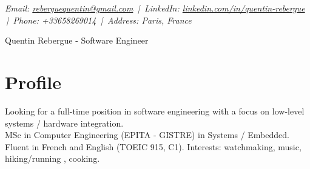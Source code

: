 \documentclass[9pt,a4paper]{article}
\newcommand{\namefont}{\fontsize{18}{22}\selectfont}
\newcommand{\tinyscript}{\fontsize{8}{8}\selectfont}
\begin{document}
\renewcommand\normalsize{\fontsize{10.5}{15}\selectfont}
\normalsize

\begin{center}
  {\tinyscript\itshape
  Email: \href{mailto:reberguequentin@gmail.com}{reberguequentin@gmail.com} \,|\,
  LinkedIn: \href{https://linkedin.com/in/quentin-rebergue}{linkedin.com/in/quentin-rebergue} \,|\,
  Phone: +33658269014 \,|\,
  Address: Paris, France}
\end{center}

\begin{center}
  {\namefont Quentin Rebergue - Software Engineer}
\end{center}

\section*{Profile}
\begin{tcolorbox}[mybox2]
Looking for a full-time position in software engineering with a focus on low-level systems / hardware integration.\\[0.3em]
MSc in Computer Engineering (EPITA - GISTRE) in Systems / Embedded.\\[0.3em]
Fluent in French and English (TOEIC 915, C1). Interests: watchmaking, music, hiking/running , cooking.
\end{tcolorbox}
\end{document}
